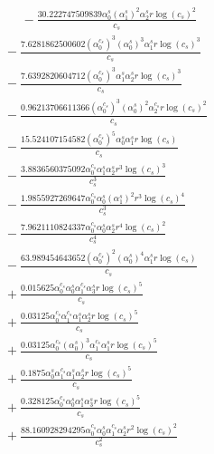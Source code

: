 \documentclass[10pt]{article}
\begin{document}
\begin{align*}
\phantom{R_{3,9}} &\phantom{={}}{}  - \frac{30.222747509839 \alpha_{0}^s \left(\alpha_{1}^s\right)^{2} \alpha_{2}^s r \log{\left(c_{s} \right)}^{2}}{c_{s}} \\
&{}  - \frac{7.6281862500602 \left(\alpha_{0}^{c_s}\right)^{3} \left(\alpha_{0}^s\right)^{3} \alpha_{1}^s r \log{\left(c_{s} \right)}^{3}}{c_{s}} \\
&{}  - \frac{7.6392820604712 \left(\alpha_{0}^{c_s}\right)^{3} \alpha_{1}^s \alpha_{2}^s r \log{\left(c_{s} \right)}^{3}}{c_{s}} \\
&{}  - \frac{0.96213706611366 \left(\alpha_{0}^{c_s}\right)^{3} \left(\alpha_{0}^s\right)^{2} \alpha_{2}^{c_s} r \log{\left(c_{s} \right)}^{2}}{c_{s}} \\
&{}  - \frac{15.524107154582 \left(\alpha_{0}^{c_s}\right)^{5} \alpha_{0}^s \alpha_{1}^s r \log{\left(c_{s} \right)}}{c_{s}} \\
&{}  - \frac{3.8836560375092 \alpha_{0}^{c_s} \alpha_{1}^s \alpha_{2}^s r^{3} \log{\left(c_{s} \right)}^{3}}{c_{s}^{3}} \\
&{}  - \frac{1.9855927269647 \alpha_{0}^{c_s} \alpha_{0}^s \left(\alpha_{1}^s\right)^{2} r^{3} \log{\left(c_{s} \right)}^{4}}{c_{s}^{3}} \\
&{}  - \frac{7.9621110824337 \alpha_{0}^{c_s} \alpha_{0}^s \alpha_{2}^s r^{4} \log{\left(c_{s} \right)}^{2}}{c_{s}^{4}} \\
&{}  - \frac{63.989454643652 \left(\alpha_{0}^{c_s}\right)^{2} \left(\alpha_{0}^s\right)^{4} \alpha_{1}^s r \log{\left(c_{s} \right)}}{c_{s}} \\
&{}  + \frac{0.015625 \alpha_{0}^{c_s} \alpha_{0}^s \alpha_{1}^{c_s} \alpha_{3}^s r \log{\left(c_{s} \right)}^{5}}{c_{s}} \\
&{}  + \frac{0.03125 \alpha_{0}^{c_s} \alpha_{1}^{c_s} \alpha_{1}^s \alpha_{2}^s r \log{\left(c_{s} \right)}^{5}}{c_{s}} \\
&{}  + \frac{0.03125 \alpha_{0}^{c_s} \left(\alpha_{0}^s\right)^{3} \alpha_{1}^{c_s} \alpha_{1}^s r \log{\left(c_{s} \right)}^{5}}{c_{s}} \\
&{}  + \frac{0.1875 \alpha_{0}^s \alpha_{1}^{c_s} \alpha_{1}^s \alpha_{2}^s r \log{\left(c_{s} \right)}^{5}}{c_{s}} \\
&{}  + \frac{0.328125 \alpha_{0}^{c_s} \alpha_{0}^s \alpha_{1}^s \alpha_{3}^s r \log{\left(c_{s} \right)}^{5}}{c_{s}} \\
&{}  + \frac{88.160928294295 \alpha_{0}^{c_s} \alpha_{0}^s \alpha_{1}^{c_s} \alpha_{2}^s r^{2} \log{\left(c_{s} \right)}^{2}}{c_{s}^{2}} \\

\end{align*}
\end{document}
